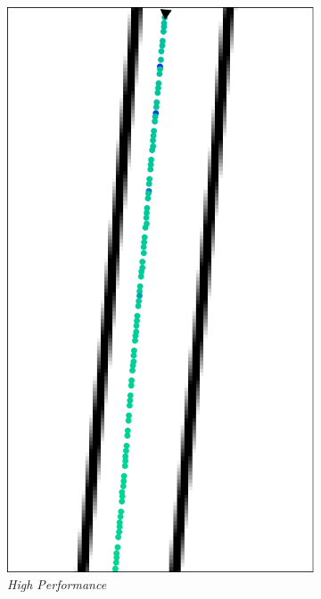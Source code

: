 \begin{figure}[H]
    \centering
    \begin{subfigure}[b]{0.3\textwidth}
        \centering
        \includegraphics[width=\textwidth]{images/monza_zoom_mpc_high_performance_speed.png} 
        \caption{\textit{High Performance}}
        \label{fig:hp_speed}
    \end{subfigure}
    \begin{subfigure}[b]{0.29\textwidth}

\end{subfigure}
\end{figure}
